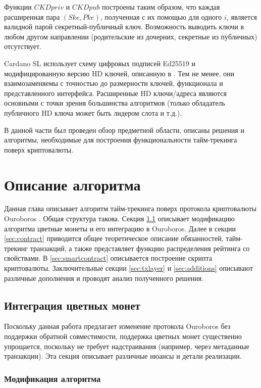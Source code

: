 \documentclass[specification,annotation]{itmo-student-thesis}
\begin{document}
Функции $CKDpriv$ и $CKDpub$ построены таким образом, что каждая
расширенная пара $(Ske,Pke)$, полученная с их помощью для одного $i$,
является валидной парой секретный-публичный ключ. Возможность выводить
ключи в любом другом направлении (родительские из дочерних, секретные
из публичных) отсутствует.

Cardano SL использует схему цифровых подписей Ed25519
\cite{bernstein2012high} и модифицированную версию HD ключей, описанную
в \cite{ed25519hd}. Тем не менее, они взаимозаменяемы с точностью до
размерности ключей, функционала и представленного
интерфейса. Расширенные HD ключи/адреса являются основными с точки
зрения большинства алгоритмов (только обладатель публичного HD ключа
может быть лидером слота и т.д.).

\finishrelatedwork

\chapterconclusion

В данной части был проведен обзор предметной области, описаны решения
и алгоритмы, необходимые для построения функциональности тайм-трекинга
поверх криптовалюты.

\chapter{Описание алгоритма}

Данная глава описывает алгоритм тайм-трекинга поверх протокола
криптовалюты Ouroboros \cite{ouroboros}. Общая структура
такова. Секция \ref{sec:colorcoins} описывает модификацию алгоритма
цветные монеты и его интеграцию в Ouroboros. Далее в секции
\ref{sec:contract} приводится общее теоретическое описание
обязанностей, тайм-трекинг транзакций, а также представляет функцию
распределения рейтинга со свойствами. В \ref{sec:smartcontract}
описывается построение скрипта криптовалюты. Заключительные секции
\ref{sec:txlayer} и \ref{sec:additions} описывают различные дополнения
и проводят анализ полученного решения.

\section{Интеграция цветных монет}
\label{sec:colorcoins}

Поскольку данная работа предлагает изменение протокола Ouroboros без
поддержки обратной совместимости, поддержка цветных монет существенно
упрощается, поскольку не требует надстраивания (например, через
метаданные транзакции). Эта секция описывает различные нюансы и детали
реализации.

\subsection{Модификация алгоритма}
\end{document}

